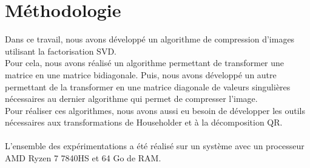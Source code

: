 \documentclass{article}
\begin{document}
\section{Méthodologie}
Dans ce travail, nous avons développé un algorithme de compression d'images utilisant la factorisation SVD.\\
Pour cela, nous avons réalisé un algorithme permettant de transformer une matrice en une matrice bidiagonale. Puis, nous avons développé un autre permettant de la transformer en une matrice diagonale de valeurs singulières nécessaires au dernier algorithme qui permet de compresser l'image.\\
Pour réaliser ces algorithmes, nous avons aussi eu besoin de développer les outils nécessaires aux transformations de Householder et à la décomposition QR.\\ \\
L'ensemble des expérimentations a été réalisé sur un système avec un processeur AMD Ryzen 7 7840HS et 64 Go de RAM. %
\end{document}
